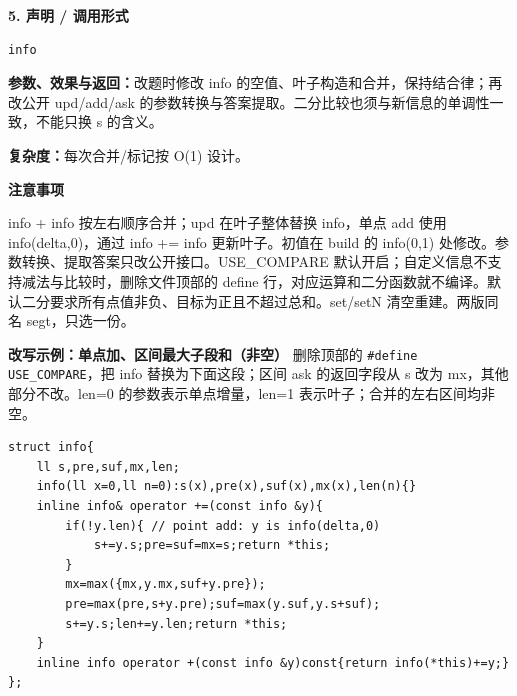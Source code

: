 \documentclass[UTF8,a4paper,10pt]{ctexart}
\newcommand{\TemplNote}[1]{\textbf{注意事项}\par #1\par}
\begin{document}
\noindent\begin{minipage}{\textwidth}
\textbf{5. 声明 / 调用形式}
\begin{lstlisting}
info
\end{lstlisting}
\textbf{参数、效果与返回：}改题时修改 info 的空值、叶子构造和合并，保持结合律；再改公开 upd/add/ask 的参数转换与答案提取。二分比较也须与新信息的单调性一致，不能只换 s 的含义。

\textbf{复杂度：}每次合并/标记按 O(1) 设计。

\TemplNote{info + info 按左右顺序合并；upd 在叶子整体替换 info，单点 add 使用 info(delta,0)，通过 info += info 更新叶子。初值在 build 的 info(0,1) 处修改。参数转换、提取答案只改公开接口。USE\_COMPARE 默认开启；自定义信息不支持减法与比较时，删除文件顶部的 define 行，对应运算和二分函数就不编译。默认二分要求所有点值非负、目标为正且不超过总和。set/setN 清空重建。两版同名 segt，只选一份。}
\end{minipage}\par\vspace{0.4em}
\textbf{改写示例：单点加、区间最大子段和（非空）}
删除顶部的 \texttt{\#define USE\_COMPARE}，把 info 替换为下面这段；区间 ask 的返回字段从 s 改为 mx，其他部分不改。len=0 的参数表示单点增量，len=1 表示叶子；合并的左右区间均非空。
\begin{lstlisting}
struct info{
	ll s,pre,suf,mx,len;
	info(ll x=0,ll n=0):s(x),pre(x),suf(x),mx(x),len(n){}
	inline info& operator +=(const info &y){
		if(!y.len){ // point add: y is info(delta,0)
			s+=y.s;pre=suf=mx=s;return *this;
		}
		mx=max({mx,y.mx,suf+y.pre});
		pre=max(pre,s+y.pre);suf=max(y.suf,y.s+suf);
		s+=y.s;len+=y.len;return *this;
	}
	inline info operator +(const info &y)const{return info(*this)+=y;}
};
\end{lstlisting}
\end{document}
